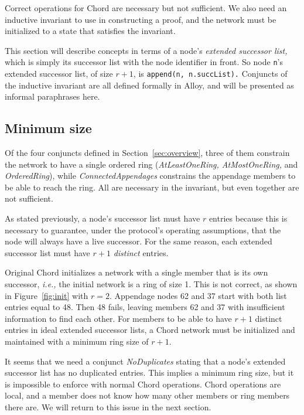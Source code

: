 \documentclass[conference]{IEEEtran}
\begin{document}
Correct operations for Chord are necessary but not sufficient.
We also need an inductive invariant to use in
constructing a proof, and the network must be initialized to a state
that satisfies the invariant.

This section will describe concepts in terms of a node's
{\it extended successor list,}
which is simply its successor list with the node identifier in 
front.
So node
\small
{\tt n}'s
\normalsize
extended successor list, of size $r + 1$, is
\small
{\tt append(n, n.succList).}
\normalsize
Conjuncts of the inductive invariant
are all defined formally in Alloy, and will be
presented as informal paraphrases here.

\subsection{Minimum size}

Of the four conjuncts defined in Section~\ref{sec:overview},
three of them constrain the network to have a single ordered ring
({\it AtLeastOneRing, AtMostOneRing,} and {\it OrderedRing}), while
{\it ConnectedAppendages} constrains the appendage members to be able to
reach the ring.
All are necessary in the invariant,
but even together are not sufficient.

As stated previously, a node's 
successor list must have $r$ entries because this is necessary
to guarantee, under the protocol's operating assumptions, that the node
will always have a live successor.
For the same reason, each extended successor list must have 
$r + 1$ {\it distinct} entries.

Original Chord initializes a network with a single member that is its
own successor, {\it i.e.,} the initial network is a ring of size 1.
This is not correct, as shown in
Figure~\ref{fig:init} with $r = 2$.
Appendage nodes 62 and 37 start with both list entries equal to 48.
Then 48 fails, leaving members 62 and 37
with insufficient information to find each other.
For members to be able to
have $r + 1$ distinct entries in ideal extended successor lists,
a Chord network must be initialized and maintained with a
minimum ring size of $r + 1$.

It seems that we need a conjunct {\it NoDuplicates} stating that a
node's extended successor list has no duplicated entries.
This implies a minimum ring size, but it is impossible to enforce
with normal Chord operations.
Chord operations are local, and a member does not know how many other
members or ring members there are.
We will return to this issue in the next section.
\end{document}
